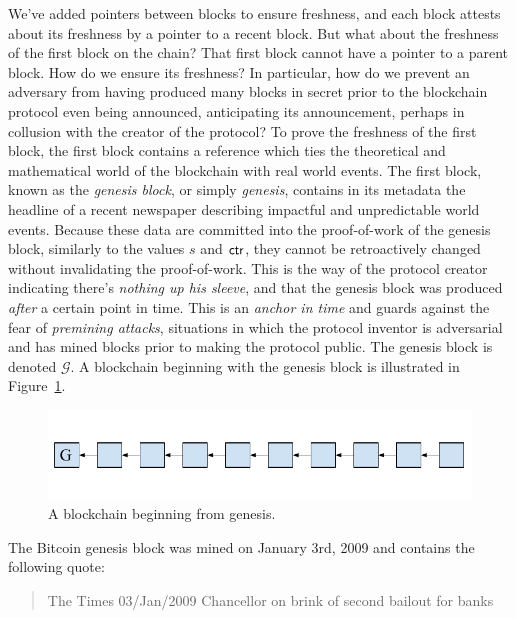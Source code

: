 We've added pointers between blocks to ensure freshness, and each block attests about
its freshness by a pointer to a recent block. But what about the freshness of the first
block on the chain? That first block cannot have a pointer to a parent block. How do we
ensure its freshness? In particular, how do we prevent an adversary from having produced
many blocks in secret prior to the blockchain protocol even being announced, anticipating
its announcement, perhaps in collusion with the creator of the protocol? To prove the
freshness of the first block, the first block contains a reference which ties the theoretical
and mathematical world of the blockchain with real world events. The first block, known as
the \emph{genesis block}, or simply \emph{genesis}, contains in its metadata
the headline of a recent newspaper describing impactful and unpredictable world events.
Because these data are committed into the proof-of-work of the genesis block, similarly
to the values $s$ and $\mathsf{ctr}$, they cannot be retroactively changed without invalidating
the proof-of-work. This is the way of the protocol creator indicating there's
\emph{nothing up his sleeve}, and that the genesis block was produced \emph{after}
a certain point in time. This is an \emph{anchor in time} and guards against the fear
of \emph{premining attacks}, situations in which the protocol inventor
is adversarial and has mined blocks prior to making the protocol public. The genesis
block is denoted $\mathcal{G}$.
A blockchain beginning with the genesis block is illustrated in Figure~\ref{fig.genesischain}.

\begin{figure}[h]
    \centering
    \includegraphics[width=0.7 \columnwidth,keepaspectratio]{figures/genesis-chain.pdf}
    \caption{A blockchain beginning from genesis.}
    \label{fig.genesischain}
\end{figure}

The Bitcoin genesis block was mined on January 3rd, 2009 and contains the following quote:

\begin{quote}
  The Times 03/Jan/2009 Chancellor on brink of second bailout for banks
\end{quote}

